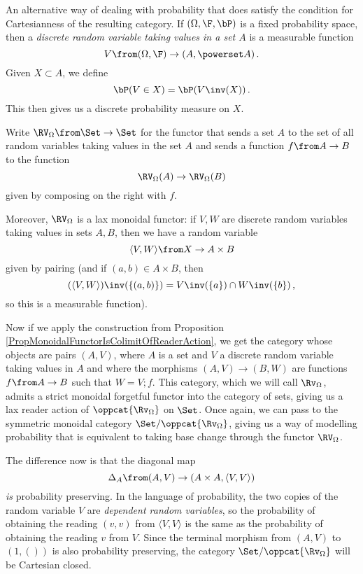 \begin{example}
  An alternative way of dealing with probability that does satisfy the condition for Cartesianness of the resulting category.
  If $(\Omega,\F,\bP)$ is a fixed probability space, then a \emph{discrete random variable taking values in a set $A$} is a measurable function
  \[
    V\from (\Omega,\F) \to (A,\powerset A)\,.
    \]
  Given $X \subset A$, we define
  \[
    \bP(V \in X) = \bP(V\inv(X))\,.
    \]
  This then gives us a discrete probability measure on $X$.

  Write $\RV_\Omega \from \Set \to \Set$ for the functor that sends a set $A$ to the set of all random variables taking values in the set $A$ and sends a function $f\from A \to B$ to the function
  \[
    \RV_\Omega(A) \to \RV_\Omega(B)
    \]
  given by composing on the right with $f$.

  Moreover, $\RV_\Omega$ is a lax monoidal functor: if $V,W$ are discrete random variables taking values in sets $A,B$, then we have a random variable 
  \[
    \langle V,W \rangle\from X \to A\times B
    \]
  given by pairing (and if $(a,b)\in A\times B$, then 
  \[
    (\langle V,W\rangle)\inv(\{(a,b)\}) = V\inv(\{a\})\cap W\inv(\{b\})\,,
    \]
  so this is a measurable function).  

  Now if we apply the construction from Proposition \ref{PropMonoidalFunctorIsColimitOfReaderAction}, we get the category whose objects are pairs $(A,V)$, where $A$ is a set and $V$ a discrete random variable taking values in $A$ and where the morphisms $(A,V) \to (B,W)$ are functions $f \from A \to B$ such that $W=V;f$.
  This category, which we will call $\Rv_\Omega$, admits a strict monoidal forgetful functor into the category of sets, giving us a lax reader action of $\oppcat{\Rv_\Omega}$ on $\Set$.
  Once again, we can pass to the symmetric monoidal category $\Set/\oppcat{\Rv_\Omega}$, giving us a way of modelling probability that is equivalent to taking base change through the functor $\RV_\Omega$.

  The difference now is that the diagonal map
  \[
    \Delta_A \from (A,V) \to (A\times A, \langle V,V\rangle)
    \]
  \emph{is} probability preserving.  
  In the language of probability, the two copies of the random variable $V$ are \emph{dependent random variables}, so the probability of obtaining the reading $(v,v)$ from $\langle V,V\rangle$ is the same as the probability of obtaining the reading $v$ from $V$.
  Since the terminal morphism from $(A,V)$ to $(1,())$ is also probability preserving, the category $\Set/\oppcat{\Rv_\Omega}$ will be Cartesian closed.
\end{example}

